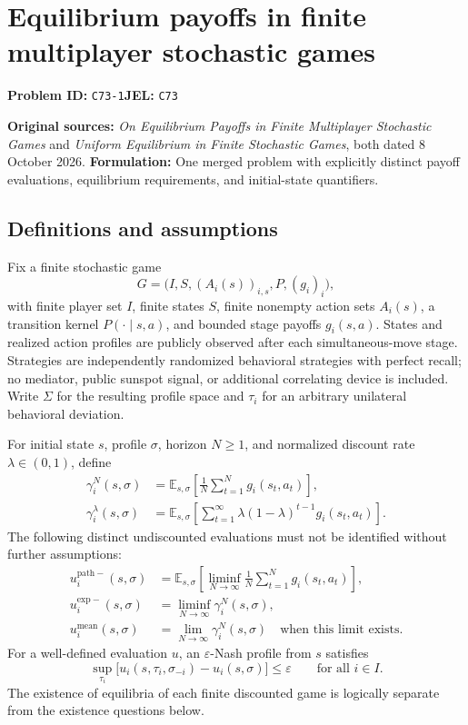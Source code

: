 \documentclass[11pt,a4paper]{article}
\newcommand{\E}{\mathbb E}
\begin{document}
\section*{Equilibrium payoffs in finite multiplayer stochastic games}
\textbf{Problem ID:} \texttt{C73-1}\quad \textbf{JEL:} \texttt{C73}\par
\label{problem:OP-0590}
\label{supp:stochastic-games}

\noindent\textbf{Original sources:} \emph{On Equilibrium Payoffs in Finite
	Multiplayer Stochastic Games} and \emph{Uniform Equilibrium in Finite
	Stochastic Games}, both dated 8 October 2026.
\textbf{Formulation:} One merged problem with explicitly distinct
payoff evaluations, equilibrium requirements, and initial-state quantifiers.

\subsection*{Definitions and assumptions}

Fix a finite stochastic game
\[
G=\bigl(I,S,(A_i(s))_{i,s},P,(g_i)_i\bigr),
\]
with finite player set $I$, finite states $S$, finite nonempty action
sets $A_i(s)$, a transition kernel $P(\cdot\mid s,a)$, and bounded
stage payoffs $g_i(s,a)$. States and realized action profiles are
publicly observed after each simultaneous-move stage. Strategies are
independently randomized behavioral strategies with perfect recall;
no mediator, public sunspot signal, or additional correlating device
is included. Write $\Sigma$ for the resulting profile space and
$\tau_i$ for an arbitrary unilateral behavioral deviation.

For initial state $s$, profile $\sigma$, horizon $N\ge1$, and normalized
discount rate $\lambda\in(0,1)$, define
\[
\begin{aligned}
	\gamma_i^N(s,\sigma)
	&=\E_{s,\sigma}\!\left[\frac1N\sum_{t=1}^{N}g_i(s_t,a_t)\right],\\
	\gamma_i^\lambda(s,\sigma)
	&=\E_{s,\sigma}\!\left[\sum_{t=1}^\infty
	\lambda(1-\lambda)^{t-1}g_i(s_t,a_t)\right].
\end{aligned}
\]
The following distinct undiscounted evaluations must not be identified
without further assumptions:
\[
\begin{aligned}
	u_i^{\mathrm{path}-}(s,\sigma)
	&=\E_{s,\sigma}\!\left[\liminf_{N\to\infty}
	\frac1N\sum_{t=1}^N g_i(s_t,a_t)\right],\\
	u_i^{\mathrm{exp}-}(s,\sigma)
	&=\liminf_{N\to\infty}\gamma_i^N(s,\sigma),\\
	u_i^{\mathrm{mean}}(s,\sigma)
	&=\lim_{N\to\infty}\gamma_i^N(s,\sigma)
	\quad\text{when this limit exists}.
\end{aligned}
\]
For a well-defined evaluation $u$, an $\varepsilon$-Nash profile
from $s$ satisfies
\[
\sup_{\tau_i}
\bigl[u_i(s,\tau_i,\sigma_{-i})-u_i(s,\sigma)\bigr]
\le\varepsilon\qquad\text{for all }i\in I.
\]
The existence of equilibria of each finite discounted game is
logically separate from the existence questions below.
\end{document}
